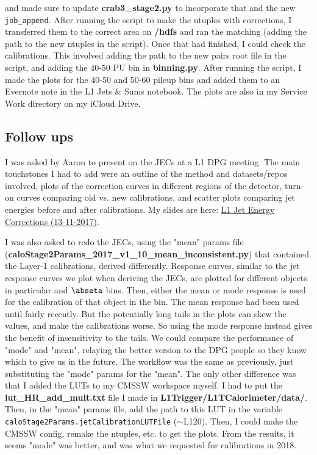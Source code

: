 and made sure to update \textbf{crab3\_stage2.py} to incorporate that and the new \texttt{job\_append}. After running the script to make the ntuples with corrections, I transferred them to the correct area on \textbf{/hdfs} and ran the matching (adding the path to the new ntuples in the script). Once that had finished, I could check the calibrations. This involved adding the path to the new pairs root file in the script, and adding the 40-50 PU bin in \textbf{binning.py}. After running the script, I made the plots for the 40-50 and 50-60 pileup bins and added them to an Evernote note in the L1 Jets \& Sums notebook. The plots are also in my Service Work directory on my iCloud Drive.


\subsection{Follow ups}

I was asked by Aaron to present on the JECs at a L1 DPG meeting. The main touchstones I had to add were an outline of the method and datasets/repos involved, plots of the correction curves in different regions of the detector, turn-on curves comparing old vs. new calibrations, and scatter plots comparing jet energies before and after calibrations. My slides are here: \href{run:modules/Sec 20 - Service Work Jet Energy Corrections/figures/20171113 L1 Jet Energy Corrections.pdf}{L1 Jet Energy Corrections (13-11-2017)}.

I was also asked to redo the JECs, using the "mean" params file (\textbf{caloStage2Params\_2017\_v1\_10\_mean\_inconsistent.py}) that contained the Layer-1 calibrations, derived differently. Response curves, similar to the jet response curves we plot when deriving the JECs, are plotted for different objects in particular \pt and $\abseta$ bins. Then, either the mean or mode response is used for the calibration of that object in the bin. The mean response had been used until fairly recently. But the potentially long tails in the plots can skew the values, and make the calibrations worse. So using the mode response instead gives the benefit of insensitivity to the tails. We could compare the performance of "mode" and "mean", relaying the better version to the DPG people so they know which to give us in the future. The workflow was the same as previously, just substituting the "mode" params for the "mean". The only other difference was that I added the LUTs to my CMSSW workspace myself. I had to put the \textbf{lut\_HR\_add\_mult.txt} file I made in \textbf{L1Trigger/L1TCalorimeter/data/}. Then, in the "mean" params file, add the path to this LUT in the variable \texttt{caloStage2Params.jetCalibrationLUTFile} ($\sim$L120). Then, I could make the CMSSW config, remake the ntuples, etc. to get the plots. From the results, it seems "mode" was better, and was what we requested for calibrations in 2018.

